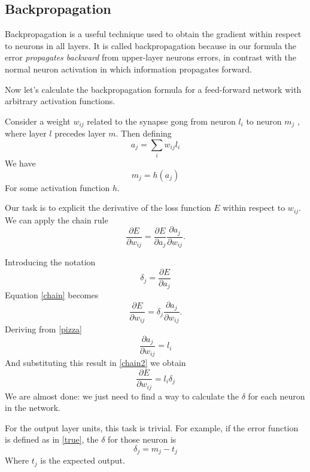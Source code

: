 \documentclass[a4paper]{report}
\begin{document}
\subsection{Backpropagation}
Backpropagation is a useful technique used to obtain the gradient within respect to neurons in all layers.
It is called backpropagation because in our formula the error \textit{propagates backward} from upper-layer neurons errors, in contrast with the normal neuron activation in which information propagates forward.

Now let's calculate the backpropagation formula for a feed-forward network with arbitrary activation functions.

Consider a weight $w_{ij}$ related to the synapse gong from neuron $l_i$ to neuron $m_j$ , where layer $l$ precedes layer $m$.
Then defining
\begin{equation}
a_j = \sum_i w_{ij}l_i
\label{pizza}
\end{equation}
We have
\begin{equation}
m_j = h(a_j)
\label{pizza2}
\end{equation}
For some activation function $h$.

Our task is to explicit the derivative of the loss function $E$ within respect to $w_{ij}$.
We can apply the chain rule
\begin{equation}
\frac{\partial E}{\partial w_{ij}}=\frac{\partial E}{\partial a_j} \frac{\partial a_j}{\partial w_{ij}}.
\label{chain}
\end{equation}

Introducing the notation
\begin{equation}
    \delta_j = \frac{\partial E}{\partial a_j}
    \label{delta}
\end{equation}
Equation \ref{chain} becomes
\begin{equation}
	\frac{\partial E}{\partial w_{ij}} = \delta_j \frac{\partial a_j}{\partial w_{ij}}.
	\label{chain2}
\end{equation}
Deriving from \ref{pizza}
\begin{equation}
\frac{\partial a_j}{\partial w_{ij}} = l_i
\end{equation}
And substituting this result in \ref{chain2} we obtain
\begin{equation}
\frac{\partial E}{\partial w_{ij}}= l_i \delta_j
\end{equation}
We are almost done:
we just need to find a way to calculate the $\delta$ for each neuron in the network.

For the output layer units, this task is trivial.
For example, if the error function is defined as in \ref{true}, the $\delta$ for those neuron is
\begin{equation}
\delta_j = m_j - t_j
\end{equation}
Where $t_j$ is the expected output.
\end{document}
